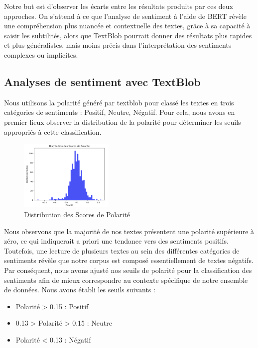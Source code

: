 \documentclass{article}
\begin{document}
Notre but est d'observer les écarts entre les résultats produits par ces deux approches. On s'attend à ce que l'analyse de sentiment à l'aide de BERT révèle une compréhension plus nuancée et contextuelle des textes, grâce à sa capacité à saisir les subtilités, alors que TextBlob pourrait donner des résultats plus rapides et plus généralistes, mais moins précis dans l'interprétation des sentiments complexes ou implicites.

\subsection{Analyses de sentiment avec TextBlob}
Nous utilisons la polarité généré par textblob pour classé les textes en trois catégories de sentiments : Positif, Neutre, Négatif. Pour cela, nous avons en premier lieux observer la distribution de la polarité pour déterminer les seuils appropriés à cette classification.

\begin{figure}[!htbp]
    \centering
    \includegraphics[width=0.4\textwidth]{polarite_distrib.png}
    \caption{Distribution des Scores de Polarité}
    \label{fig:plots}
\end{figure}

Nous observons que la majorité de nos textes présentent une polarité supérieure à zéro, ce qui indiquerait a priori une tendance vers des sentiments positifs. Toutefois, une lecture de plusieurs textes au sein des différentes catégories de sentiments révèle que notre corpus est composé essentiellement de textes négatifs. Par conséquent, nous avons ajusté nos seuils de polarité pour la classification des sentiments afin de mieux correspondre au contexte spécifique de notre ensemble de données. Nous avons établi les seuils suivants :
\\
\begin{itemize}
    \item Polarité > 0.15 : Positif
    \item 0.13 > Polarité > 0.15 : Neutre
    \item Polarité < 0.13 : Négatif
\end{itemize}
\end{document}
